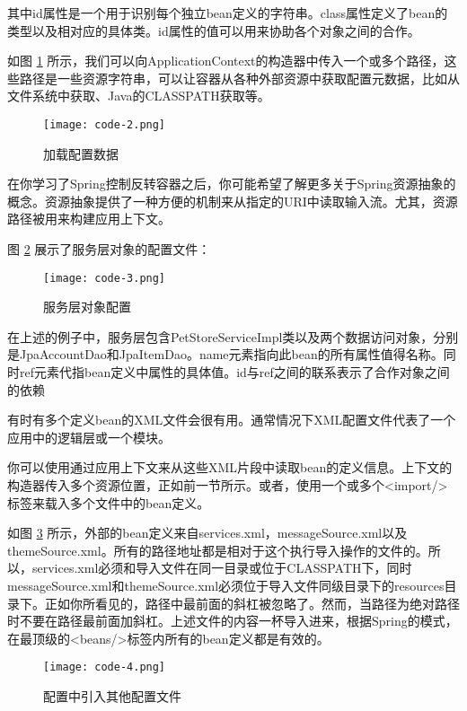 其中id属性是一个用于识别每个独立bean定义的字符串。class属性定义了bean的类型以及相对应的具体类。id属性的值可以用来协助各个对象之间的合作。


如图 \ref{fig:spring-code-2} 所示，我们可以向ApplicationContext的构造器中传入一个或多个路径，这些路径是一些资源字符串，可以让容器从各种外部资源中获取配置元数据，比如从文件系统中获取、Java的CLASSPATH获取等。

\begin{figure}[!ht]
  \centering
  \texttt{[image: code-2.png]}
  \caption{加载配置数据}
  \label{fig:spring-code-2}
\end{figure}

在你学习了Spring控制反转容器之后，你可能希望了解更多关于Spring资源抽象的概念。资源抽象提供了一种方便的机制来从指定的URI中读取输入流。尤其，资源路径被用来构建应用上下文。

图 \ref{fig:spring-code-3} 展示了服务层对象的配置文件：

\begin{figure}[!ht]
  \centering
  \texttt{[image: code-3.png]}
  \caption{服务层对象配置}
  \label{fig:spring-code-3}
\end{figure}

在上述的例子中，服务层包含PetStoreServiceImpl类以及两个数据访问对象，分别是JpaAccountDao和JpaItemDao。name元素指向此bean的所有属性值得名称。同时ref元素代指bean定义中属性的具体值。id与ref之间的联系表示了合作对象之间的依赖

有时有多个定义bean的XML文件会很有用。通常情况下XML配置文件代表了一个应用中的逻辑层或一个模块。

你可以使用通过应用上下文来从这些XML片段中读取bean的定义信息。上下文的构造器传入多个资源位置，正如前一节所示。或者，使用一个或多个<import/>标签来载入多个文件中的bean定义。

如图 \ref{fig:spring-code-4} 所示，外部的bean定义来自services.xml，messageSource.xml以及themeSource.xml。所有的路径地址都是相对于这个执行导入操作的文件的。所以，services.xml必须和导入文件在同一目录或位于CLASSPATH下，同时messageSource.xml和themeSource.xml必须位于导入文件同级目录下的resources目录下。正如你所看见的，路径中最前面的斜杠被忽略了。然而，当路径为绝对路径时不要在路径最前面加斜杠。上述文件的内容一杯导入进来，根据Spring的模式，在最顶级的<beans/>标签内所有的bean定义都是有效的。

\begin{figure}[!ht]
  \centering
  \texttt{[image: code-4.png]}
  \caption{配置中引入其他配置文件}
  \label{fig:spring-code-4}
\end{figure}

